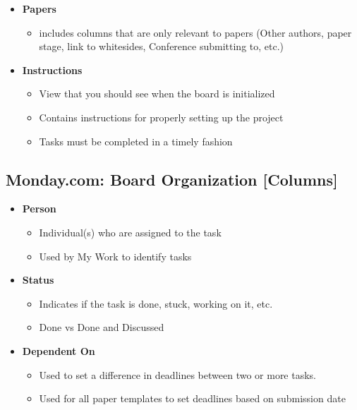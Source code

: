 \documentclass[
  letterpaper,
  DIV=11,
  numbers=noendperiod]{scrartcl}
\providecommand{\tightlist}{%
  \setlength{\itemsep}{0pt}\setlength{\parskip}{0pt}}\usepackage{longtable,booktabs,array}
\begin{document}
\begin{itemize}
\tightlist
\item
  {\textbf{Papers} }

  \begin{itemize}
  \tightlist
  \item
    includes columns that are only relevant to papers (Other authors,
    paper stage, link to whitesides, Conference submitting to, etc.)
  \end{itemize}
\item
  {\textbf{Instructions} }

  \begin{itemize}
  \tightlist
  \item
    View that you should see when the board is initialized
  \item
    Contains instructions for properly setting up the project
  \item
    Tasks must be completed in a timely fashion
  \end{itemize}
\end{itemize}

\subsection{Monday.com: Board Organization
{[}Columns{]}}\label{monday.com-board-organization-columns}

\begin{itemize}
\tightlist
\item
  {\textbf{Person} }

  \begin{itemize}
  \tightlist
  \item
    Individual(s) who are assigned to the task
  \item
    Used by My Work to identify tasks
  \end{itemize}
\item
  {\textbf{Status} }

  \begin{itemize}
  \tightlist
  \item
    Indicates if the task is done, stuck, working on it, etc.
  \item
    Done vs Done and Discussed
  \end{itemize}
\item
  {\textbf{Dependent On} }

  \begin{itemize}
  \tightlist
  \item
    Used to set a difference in deadlines between two or more tasks.
  \item
    Used for all paper templates to set deadlines based on submission
    date
  \end{itemize}
\end{itemize}
\end{document}
